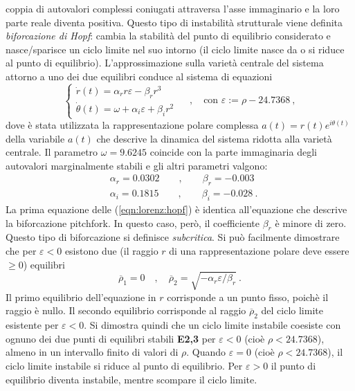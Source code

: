  coppia di autovalori complessi coniugati attraversa l'asse immaginario e la loro parte
 reale diventa positiva. Questo tipo di instabilità strutturale viene definita
 \textit{biforcazione di Hopf}: cambia la stabilità del punto di equilibrio considerato 
 e nasce/sparisce un ciclo limite nel suo intorno (il ciclo limite nasce da o si riduce al punto di equilibrio).
L'approssimazione sulla varietà centrale del sistema attorno a uno dei due equilibri conduce 
 al sistema di equazioni
\begin{equation}\label{eqn:lorenz:hopf}
\begin{cases}
 \dot{r}(t) = \alpha_r r \varepsilon - \beta_r r^3 \\
 \dot{\theta}(t) = \omega + \alpha_i \varepsilon + \beta_i r^2 \ 
\end{cases} \quad , \quad 
 \text{con } \varepsilon := \rho-24.7368 \ ,
\end{equation}
dove è stata utilizzata la rappresentazione polare complessa $a(t) = r(t) e^{i \theta(t)}$
 della variabile $a(t)$ che descrive la dinamica del sistema ridotta alla varietà centrale.
 Il parametro $\omega = 9.6245$ coincide con la parte immaginaria degli autovalori marginalmente
 stabili e gli altri parametri valgono:
\begin{equation}
\begin{aligned}
 & \alpha_r = 0.0302 \qquad , \qquad \beta_r =-0.003 \\
 & \alpha_i = 0.1815 \qquad , \qquad \beta_i =-0.028 \ . 
\end{aligned}
\end{equation}
La prima equazione delle (\ref{eqn:lorenz:hopf}) è identica all'equazione che descrive la 
 biforcazione pitchfork. In questo caso, però, il coefficiente $\beta_r$ è minore di zero. Questo
 tipo di biforcazione si definisce \textit{subcritica}. Si può facilmente dimostrare che
 per $\varepsilon < 0$ esistono due (il raggio $r$ di una rappresentazione polare deve
 essere $\geq 0$) equilibri
\begin{equation}
 \overline{\rho}_1 = 0 \quad , \quad \overline{\rho}_2 = \sqrt{-\alpha_r \varepsilon / \beta_r} \ .
\end{equation}
Il primo equilibrio dell'equazione in $r$ corrisponde a un punto fisso, poichè il raggio è nullo.
 Il secondo equilibrio corrisponde al raggio $\overline{\rho}_2$ del ciclo limite
 esistente per $\varepsilon < 0$.
Si dimostra quindi che un ciclo limite instabile coesiste con ognuno dei due punti di
 equilibri stabili \textbf{E2,3} per $\varepsilon < 0$ (cioè $\rho < 24.7368$), almeno
 in un intervallo finito di valori di $\rho$.
Quando $\varepsilon = 0$ (cioè $\rho < 24.7368$), il ciclo limite instabile si riduce al punto
 di equilibrio. Per $\varepsilon > 0$ il punto di equilibrio diventa instabile, mentre
 scompare il ciclo limite.

